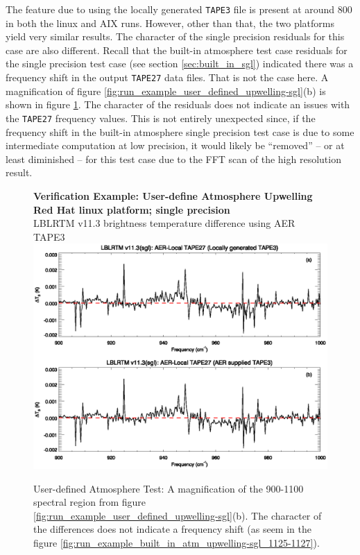 The feature due to using the locally generated \texttt{TAPE3} file is present at around 800\invcm{} in both the linux and AIX runs. However, other than that, the two platforms yield very similar results. The character of the single precision residuals for this case are also different. Recall that the built-in atmosphere test case residuals for the single precision test case (see section \ref{sec:built_in_sgl}) indicated there was a frequency shift in the output \texttt{TAPE27} data files. That is not the case here. A magnification of figure \ref{fig:run_example_user_defined_upwelling-sgl}(b) is shown in figure \ref{fig:run_example_user_defined_upwelling-sgl_900-1000}. The character of the residuals does not indicate an issues with the \texttt{TAPE27} frequency values. This is not entirely unexpected since, if the frequency shift in the built-in atmosphere single precision test case is due to some intermediate computation at low precision, it would likely be ``removed'' -- or at least diminished -- for this test case due to the FFT scan of the high resolution result.

\begin{figure}[htp]
  \centering
  \qquad\sffamily\textbf{Verification Example: User-define Atmosphere Upwelling}\\
  \qquad\sffamily\textbf{Red Hat linux platform; single precision}\\
  \qquad\textsf{LBLRTM v11.3 brightness temperature difference using AER TAPE3}
  \includegraphics[bb=80 226 534 381,clip,scale=1.0]{graphics/run_example_user_defined_upwelling/sgl_900-1000.eps}
  \caption{User-defined Atmosphere Test: A magnification of the 900-1100\invcm{} spectral region from figure \ref{fig:run_example_user_defined_upwelling-sgl}(b). The character of the differences does not indicate a frequency shift (as seem in the figure \ref{fig:run_example_built_in_atm_upwelling-sgl_1125-1127}).}
  \label{fig:run_example_user_defined_upwelling-sgl_900-1000}
\end{figure}
